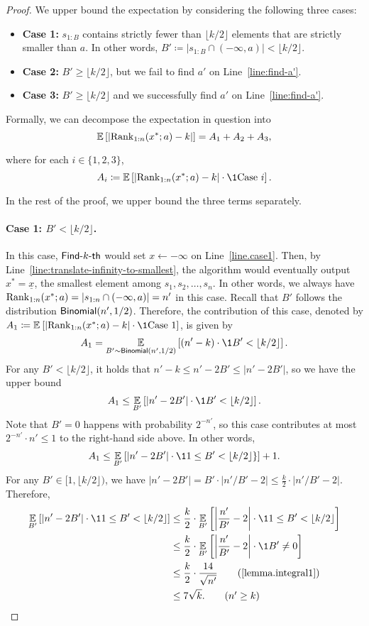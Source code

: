 \begin{proof}
We upper bound the expectation by considering the following three cases:
\begin{itemize}
    \item \textbf{Case 1:} $s_{1:B}$ contains strictly fewer than $\lfloor k/2 \rfloor$ elements that are strictly smaller than $a$. In other words, $B' \coloneqq |s_{1:B} \cap (-\infty, a)| < \lfloor k/2 \rfloor$.
    \item \textbf{Case 2:} $B' \ge \lfloor k/2 \rfloor$, but we fail to find $a'$ on Line~\ref{line:find-a'}.
    \item \textbf{Case 3:} $B' \ge \lfloor k/2 \rfloor$ and we successfully find $a'$ on Line~\ref{line:find-a'}. 
\end{itemize}
Formally, we can decompose the expectation in question into
\[
    \operatorname*{\mathbb{E}}_{}\left[\left|\mathrm{Rank}_{1:n}(x^*; a) - k\right|\right] = A_1 + A_2 + A_3,
\]
where for each $i \in \{1, 2, 3\}$,
\[
    A_i \coloneqq \Ex{}{\left|\rank_{1:n}(x^*; a) - k\right|\cdot \1{\text{Case $i$}}}.
\]
In the rest of the proof, we upper bound the three terms separately.

\paragraph{Case 1: $B' < \lfloor k/2 \rfloor$.} In this case, $\textsf{Find-}k\textsf{-th}$ would set $x \gets -\infty$ on Line~\ref{line.case1}. Then, by Line~\ref{line:translate-infinity-to-smallest}, the algorithm would eventually output $x^* = \underline{x}$, the smallest element among $s_1, s_2, \ldots, s_n$. In other words, we always have $\mathrm{Rank}_{1:n}(x^*; a) = |s_{1:n} \cap (-\infty, a)| = n'$ in this case. Recall that $B'$ follows the distribution $\mathsf{Binomial}(n', 1/2)$. Therefore, the contribution of this case, denoted by $A_1 \coloneqq \Ex{}{|\rank_{1:n}(x^*; a) - k| \cdot \1{\text{Case 1}}}$, is given by
\[
    A_1
=   \Ex{B' \sim \Binomial(n', 1/2)}{(n' - k) \cdot \1{B' < \lfloor k/2 \rfloor}}.
\]
For any $B' < \lfloor k / 2 \rfloor$, it holds that
$n' - k \le n' - 2B' \le |n' - 2B'|$, so we have the upper bound
\[
    A_1
\le \Ex{B'}{\left|n' - 2B'\right| \cdot \1{B'< \lfloor k/2\rfloor}}.
\]
Note that $B' = 0$ happens with probability $2^{-n'}$, so this case contributes at most $2^{-n'}\cdot n' \le 1$ to the right-hand side above. In other words,
\[
    A_1 \le \Ex{B'}{\left|n' - 2B'\right| \cdot \1{ 1\le B'< \lfloor k/2\rfloor}\}} + 1.
\]
For any $B' \in [1, \lfloor k/2 \rfloor)$, we have $|n' - 2B'|
=   B'\cdot|n' / B' - 2|
\le \frac{k}{2}\cdot |n' / B' - 2|$. Therefore,
\begin{align*}
        \Ex{B'}{\left|n' - 2B'\right| \cdot \1{1 \le B'< \lfloor k/2\rfloor}}
&\le    \frac{k}{2} \cdot \Ex{B'}{\left|\frac{n'}{B'}-2\right| \cdot \1{ 1\le B'< \lfloor k/2\rfloor}}\\
&\le    \frac{k}{2}\cdot\Ex{B'}{\left|\frac{n'}{B'}-2\right| \cdot \1{B' \ne 0}}\\
&\le    \frac{k}{2}\cdot \frac{14}{\sqrt{n'}} \tag{\Cref{lemma.integral1}}\\
&\le    7\sqrt{k}. \tag{$n' \ge k$}
\end{align*}


\end{proof}
